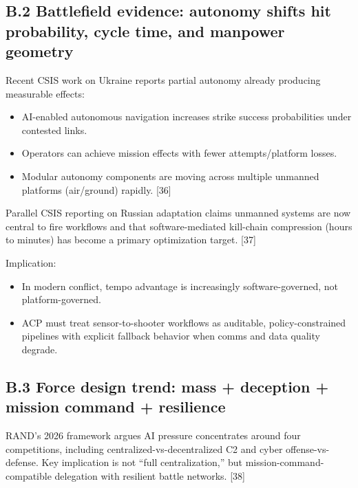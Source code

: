 \documentclass[
]{article}
\providecommand{\tightlist}{%
  \setlength{\itemsep}{0pt}\setlength{\parskip}{0pt}}
\begin{document}
\hypertarget{b.2-battlefield-evidence-autonomy-shifts-hit-probability-cycle-time-and-manpower-geometry}{%
\subsection{B.2 Battlefield evidence: autonomy shifts hit probability,
cycle time, and manpower
geometry}\label{b.2-battlefield-evidence-autonomy-shifts-hit-probability-cycle-time-and-manpower-geometry}}

Recent CSIS work on Ukraine reports partial autonomy already producing
measurable effects:

\begin{itemize}
\tightlist
\item
  AI-enabled autonomous navigation increases strike success
  probabilities under contested links.
\item
  Operators can achieve mission effects with fewer attempts/platform
  losses.
\item
  Modular autonomy components are moving across multiple unmanned
  platforms (air/ground) rapidly. {[}36{]}
\end{itemize}

Parallel CSIS reporting on Russian adaptation claims unmanned systems
are now central to fire workflows and that software-mediated kill-chain
compression (hours to minutes) has become a primary optimization target.
{[}37{]}

Implication:

\begin{itemize}
\tightlist
\item
  In modern conflict, tempo advantage is increasingly software-governed,
  not platform-governed.
\item
  ACP must treat sensor-to-shooter workflows as auditable,
  policy-constrained pipelines with explicit fallback behavior when
  comms and data quality degrade.
\end{itemize}

\hypertarget{b.3-force-design-trend-mass-deception-mission-command-resilience}{%
\subsection{B.3 Force design trend: mass + deception + mission command +
resilience}\label{b.3-force-design-trend-mass-deception-mission-command-resilience}}

RAND's 2026 framework argues AI pressure concentrates around four
competitions, including centralized-vs-decentralized C2 and cyber
offense-vs-defense. Key implication is not ``full centralization,'' but
mission-command-compatible delegation with resilient battle networks.
{[}38{]}
\end{document}
